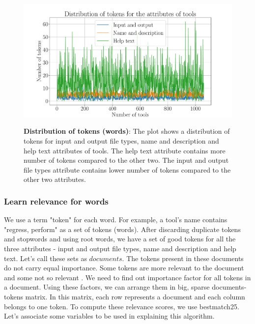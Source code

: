 \begin{figure}[h]
\begin{centering}
    {\includegraphics[scale=0.4]{figures/Tokens_dist.pdf}}
    \caption[Tokens distribution]{\textbf{Distribution of tokens (words)}: The plot shows a distribution of tokens for input and output file types, name and description and help text attributes of tools. The help text attribute contains more number of tokens compared to the other two. The input and output file types attribute contains lower number of tokens compared to the other two attributes. }
\end{centering}
\end{figure}

\subsubsection{Learn relevance for words}
    We use a term "token" for each word. For example, a tool's name contains "regress, perform" as a set of tokens (words). After discarding duplicate tokens and stopwords and using root words, we have a set of good tokens for all the three attributes - input and output file types, name and description and help text. Let's call these sets as $documents$. The tokens present in these documents do not carry equal importance. Some tokens are more relevant to the document and some not so relevant . We need to find out importance factor for all tokens in a document. Using these factors, we can arrange them in big, sparse documents-tokens matrix. In this matrix, each row represents a document and each column belongs to one token. To compute these relevance scores, we use bestmatch25. Let's associate some variables to be used in explaining this algorithm.

